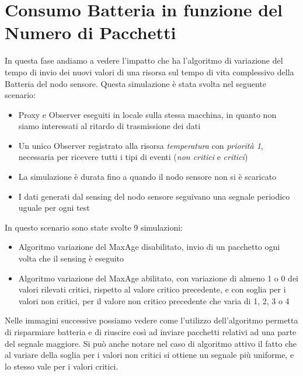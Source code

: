     \section{Consumo Batteria in funzione del Numero di Pacchetti}

    In questa fase andiamo a vedere l'impatto che ha l'algoritmo di variazione del tempo di invio dei nuovi valori di una risorsa sul tempo di vita complessivo della Batteria del nodo sensore.\newline
    Questa simulazione è stata svolta nel seguente scenario:
    \begin{itemize}
      \item Proxy e Observer eseguiti in locale sulla stessa macchina, in quanto non siamo interessati al ritardo di trasmissione dei dati
      \item Un unico Observer registrato alla risorsa \textit{temperatura} con \textit{priorità 1}, necessaria per ricevere tutti i tipi di eventi (\textit{non critici} e \textit{critici})
      \item La simulazione è durata fino a quando il nodo sensore non si è scaricato
      \item I dati generati dal sensing del nodo sensore seguivano una segnale periodico uguale per ogni test
    \end{itemize}
    In questo scenario sono state svolte 9 simulazioni:
    \begin{itemize}
      \item Algoritmo variazione del MaxAge disabilitato, invio di un pacchetto ogni volta che il sensing è eseguito
      \item Algoritmo variazione del MaxAge abilitato, con variazione di almeno 1 o 0 dei valori rilevati critici, rispetto al valore critico precedente, e con soglia per i valori non critici, per il valore non critico precedente che varia di 1, 2, 3 o 4
    \end{itemize}
    Nelle immagini successive possiamo vedere come l'utilizzo dell'algoritmo permetta di risparmiare batteria e di riuscire così ad inviare pacchetti relativi ad una parte del segnale maggiore. Si può anche notare nel caso di algoritmo attivo il fatto che al variare della soglia per i valori non critici si ottiene un segnale più uniforme, e lo stesso vale per i valori critici.
